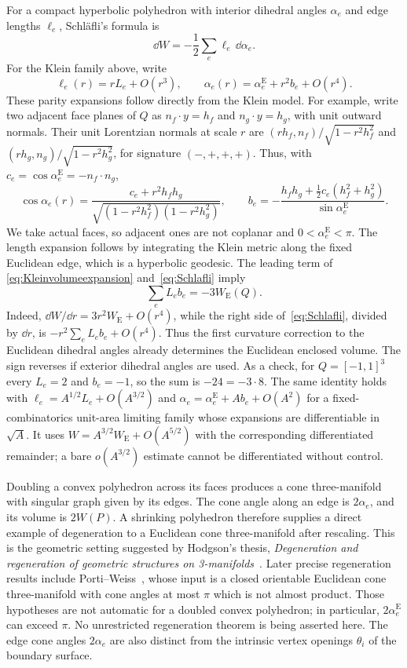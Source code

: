 For a compact hyperbolic polyhedron with interior dihedral angles
$\alpha_e$ and edge lengths $\ell_e$, Schl\"afli's formula is
\begin{equation}
 \dd W=-\frac12\sum_e\ell_e\,\dd\alpha_e.
 \label{eq:Schlafli}
\end{equation}
For the Klein family above, write
\[
 \ell_e(r)=rL_e+O(r^3),\qquad
 \alpha_e(r)=\alpha_e^{\mathrm E}+r^2b_e+O(r^4).
\]
These parity expansions follow directly from the Klein model.
For example, write two adjacent face planes of $Q$ as
$n_f\cdot y=h_f$ and $n_g\cdot y=h_g$, with unit outward normals.
Their unit Lorentzian normals at scale $r$ are
$(rh_f,n_f)/\sqrt{1-r^2h_f^2}$ and
$(rh_g,n_g)/\sqrt{1-r^2h_g^2}$, for signature $(-,+,+,+)$.
Thus, with $c_e=\cos\alpha_e^{\mathrm E}=-n_f\cdot n_g$,
\[
 \cos\alpha_e(r)
 =\frac{c_e+r^2h_fh_g}
        {\sqrt{(1-r^2h_f^2)(1-r^2h_g^2)}},\qquad
 b_e=-\frac{h_fh_g+\tfrac12c_e(h_f^2+h_g^2)}
                {\sin\alpha_e^{\mathrm E}}.
\]
We take actual faces, so adjacent ones are not coplanar and
$0<\alpha_e^{\mathrm E}<\pi$. The length expansion follows by
integrating the Klein metric along the fixed Euclidean edge,
which is a hyperbolic geodesic. The leading term of
\eqref{eq:Kleinvolumeexpansion} and~\eqref{eq:Schlafli} imply
\begin{equation}
 \boxed{\quad\sum_eL_e b_e=-3W_{\mathrm E}(Q).\quad}
 \label{eq:firstcurvaturevolume}
\end{equation}
Indeed, $\dd W/\dd r=3r^2W_{\mathrm E}+O(r^4)$, while
the right side of~\eqref{eq:Schlafli}, divided by $\dd r$, is
$-r^2\sum_eL_e b_e+O(r^4)$. Thus the first curvature correction
to the Euclidean dihedral angles already determines the Euclidean
enclosed volume. The sign reverses if exterior dihedral angles are
used. As a check, for $Q=[-1,1]^3$ every $L_e=2$ and
$b_e=-1$, so the sum is $-24=-3\cdot8$.
The same identity holds with
$\ell_e=A^{1/2}L_e+O(A^{3/2})$ and
$\alpha_e=\alpha_e^{\mathrm E}+A b_e+O(A^2)$ for a fixed-combinatorics
unit-area limiting family whose expansions are differentiable
in $\sqrt A$. It uses $W=A^{3/2}W_{\mathrm E}+O(A^{5/2})$
with the corresponding differentiated remainder; a bare
$o(A^{3/2})$ estimate cannot be differentiated without control.

Doubling a convex polyhedron across its faces produces a cone
three-manifold with singular graph given by its edges. The cone
angle along an edge is $2\alpha_e$, and its volume is $2W(P)$.
A shrinking polyhedron therefore supplies a direct example of
degeneration to a Euclidean cone three-manifold after rescaling.
This is the geometric setting suggested by Hodgson's thesis,
\emph{Degeneration and regeneration of geometric structures on
3-manifolds}~\cite{HodgsonThesis}. Later precise regeneration results
include Porti--Weiss~\cite[Theorem~1.3]{PortiWeiss}, whose input
is a closed orientable Euclidean cone three-manifold with cone
angles at most $\pi$ which is not almost product. Those
hypotheses are not automatic for a doubled convex polyhedron;
in particular, $2\alpha_e^{\mathrm E}$ can exceed $\pi$. No unrestricted
regeneration theorem is being asserted here. The edge cone angles
$2\alpha_e$ are also distinct from the intrinsic vertex openings
$\theta_i$ of the boundary surface.

